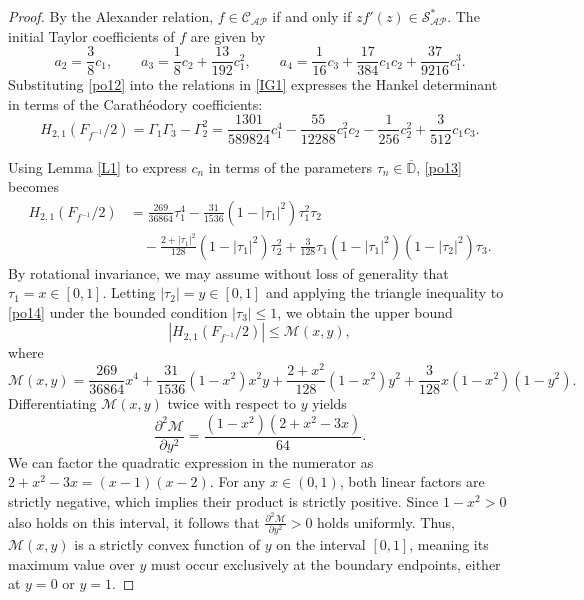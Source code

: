 \documentclass[11pt]{article}
\numberwithin{equation}{section}
\begin{document}
\begin{proof}
By the Alexander relation, $f \in \mathcal{C}_{\mathcal{AP}}$ if and only if $zf'(z) \in \mathcal{S}_{\mathcal{AP}}^{*}$. The initial Taylor coefficients of $f$ are given by
\begin{equation}\label{po12}
a_2 = \frac{3}{8}c_1, \qquad a_3 = \frac{1}{8}c_2 + \frac{13}{192}c_1^2, \qquad a_4 = \frac{1}{16}c_3 + \frac{17}{384}c_1c_2 + \frac{37}{9216}c_1^3.
\end{equation}
Substituting \eqref{po12} into the relations in \eqref{IG1} expresses the Hankel determinant in terms of the Carath\'{e}odory coefficients:
\begin{equation}\label{po13}
H_{2,1}\left(F_{f^{-1}}/2\right) = \Gamma_1\Gamma_3-\Gamma_2^2 = \frac{1301}{589824}c_1^4 -\frac{55}{12288}c_1^2c_2 -\frac{1}{256}c_2^2 +\frac{3}{512}c_1c_3.
\end{equation}

Using Lemma \ref{L1} to express $c_n$ in terms of the parameters $\tau_n \in \overline{\mathbb{D}}$, \eqref{po13} becomes
\begin{equation}\label{po14}
\begin{aligned}
H_{2,1}\left(F_{f^{-1}}/2\right) &= \frac{269}{36864}\tau_1^4 -\frac{31}{1536}(1-|\tau_1|^2)\tau_1^2\tau_2 \\
&\quad -\frac{2+|\tau_1|^2}{128}(1-|\tau_1|^2)\tau_2^2 +\frac{3}{128}\tau_1(1-|\tau_1|^2)(1-|\tau_2|^2)\tau_3.
\end{aligned}
\end{equation}
By rotational invariance, we may assume without loss of generality that $\tau_1 = x \in [0,1]$. Letting $|\tau_2| = y \in [0,1]$ and applying the triangle inequality to \eqref{po14} under the bounded condition $|\tau_3| \le 1$, we obtain the upper bound
\[
\left|H_{2,1}\left(F_{f^{-1}}/2\right)\right| \leq \mathcal{M}(x,y),
\]
where
\[
\mathcal{M}(x,y) = \frac{269}{36864}x^4 +\frac{31}{1536}(1-x^2)x^2y +\frac{2+x^2}{128}(1-x^2)y^2 +\frac{3}{128}x(1-x^2)(1-y^2).
\]
Differentiating $\mathcal{M}(x,y)$ twice with respect to $y$ yields
\[
\frac{\partial^2\mathcal{M}}{\partial y^2} = \frac{(1-x^2)(2+x^2-3x)}{64}.
\]
We can factor the quadratic expression in the numerator as $2+x^2-3x = (x-1)(x-2)$. For any $x \in (0,1)$, both linear factors are strictly negative, which implies their product is strictly positive. Since $1-x^2 > 0$ also holds on this interval, it follows that $\frac{\partial^2\mathcal{M}}{\partial y^2} > 0$ holds uniformly. Thus, $\mathcal{M}(x,y)$ is a strictly convex function of $y$ on the interval $[0,1]$, meaning its maximum value over $y$ must occur exclusively at the boundary endpoints, either at $y=0$ or $y=1$.


\end{proof}
\end{document}
